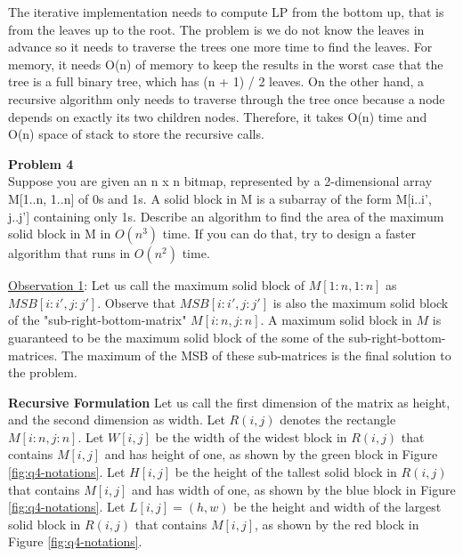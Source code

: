 \documentclass[12pt,article]{article}
\newenvironment{problem}[2][Problem]
    { \begin{mdframed}[backgroundcolor=gray!20] \textbf{#1 #2} \\}
    {  \end{mdframed}}
\begin{document}
The iterative implementation needs to compute LP from the bottom up, that is from the leaves up to the root. The problem is we do not know the leaves in advance so it needs to traverse the trees one more time to find the leaves. For memory, it needs O(n) of memory to keep the results in the worst case that the tree is a full binary tree, which has (n + 1) / 2 leaves. On the other hand, a recursive algorithm only needs to traverse through the tree once because a node depends on exactly its two children nodes. Therefore, it takes O(n) time and O(n) space of stack to store the recursive calls.

\newpage
\begin{problem}{4} 
Suppose you are given an n x n bitmap, represented by a 2-dimensional array M[1..n, 1..n] of 0s and 1s. A solid block in M is a subarray of the form M[i..i', j..j'] containing only 1s. Describe an algorithm to find the area of the maximum solid block in M in $O(n^3)$ time. If you can do that, try to design a faster algorithm that runs in $O(n^2)$ time.
\end{problem}

\underline{Observation 1}: Let us call the maximum solid block of $M[1:n,1:n]$ as $MSB[i:i',j:j']$. Observe that $MSB[i:i',j:j']$ is also the maximum solid block of the "sub-right-bottom-matrix" $M[i:n,j:n]$. A maximum solid block in $M$ is guaranteed to be the maximum solid block of the some of the sub-right-bottom-matrices. The maximum of the MSB of these sub-matrices is the final solution to the problem.

\textbf{Recursive Formulation}
Let us call the first dimension of the matrix as height, and the second dimension as width. Let $R(i,j)$ denotes the rectangle $M[i:n,j:n]$. Let $W[i,j]$ be the width of the widest block in $R(i,j)$ that contains $M[i,j]$ and has height of one, as shown by the green block in Figure \ref{fig:q4-notations}. Let $H[i,j]$ be the height of the tallest solid block in $R(i,j)$ that contains $M[i,j]$ and has width of one, as shown by the blue block in Figure \ref{fig:q4-notations}. Let $L[i,j] = (h,w)$ be the height and width of the largest solid block in $R(i,j)$ that contains $M[i,j]$, as shown by the red block in Figure \ref{fig:q4-notations}.
\end{document}
